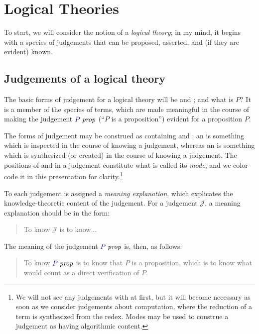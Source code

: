 \documentclass[main.tex]{subfiles}
\begin{document}
\onehalfspacing

\chapter{Logical Theories}

To start, we will consider the notion of a \emph{logical theory}; in
my mind, it begins with a species  of judgements that can be
proposed, asserted, and (if they are evident) known.

\section{Judgements of a logical theory}

The basic forms of judgement for a logical theory will be
 and ; and what is $P$?  It is a
member of the species of terms, which are made meaningful in the course of
making the judgement $\isprop{P}$ (``$P$ is a proposition'') evident for a
proposition $P$.

The forms of judgement may be construed as containing
 and ; an
 is something which is inspected in the course of
knowing a judgement, whereas an  is something which
is synthesized (or created) in the course of knowing a judgement. The positions
of  and  in a judgement
constitute what is called its \emph{mode}, and we color-code it in this
presentation for clarity.\footnote{We will not see any judgements with
   at first, but it will become necessary as soon
  as we consider judgements about computation, where the reduction of a term is
synthesized from the redex. Modes may be used to construe a judgement as having
algorithmic content.}

To each judgement is assigned a \emph{meaning explanation}, which explicates
the knowledge-theoretic content of the judgement. For a judgement
$\mathcal{J}$, a meaning explanation should be in the form:

\begin{quote}
  To know $\mathcal{J}$ is to know...
\end{quote}

The meaning of the judgement $\isprop{P}$ is, then, as follows:

\begin{quote}
  To know $\isprop{P}$ is to know that $P$ is a proposition, which is to know
  what would count as a direct verification of $P$.
\end{quote}
\end{document}
